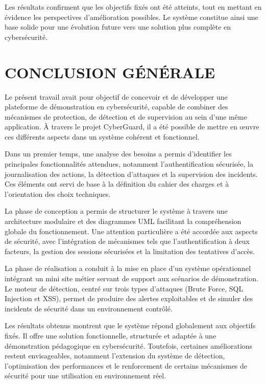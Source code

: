 \documentclass[a4paper,12pt]{report}
\begin{document}
    Les résultats confirment que les objectifs fixés ont été atteints, tout en mettant en évidence les perspectives d’amélioration possibles. Le système constitue ainsi une base solide pour une évolution future vers une solution plus complète en cybersécurité.
    
    \chapter{CONCLUSION GÉNÉRALE}
    
    Le présent travail avait pour objectif de concevoir et de développer une plateforme de démonstration en cybersécurité, capable de combiner des mécanismes de protection, de détection et de supervision au sein d’une même application. À travers le projet CyberGuard, il a été possible de mettre en œuvre ces différents aspects dans un système cohérent et fonctionnel.
    
    Dans un premier temps, une analyse des besoins a permis d’identifier les principales fonctionnalités attendues, notamment l’authentification sécurisée, la journalisation des actions, la détection d’attaques et la supervision des incidents. Ces éléments ont servi de base à la définition du cahier des charges et à l’orientation des choix techniques.
    
    La phase de conception a permis de structurer le système à travers une architecture modulaire et des diagrammes UML facilitant la compréhension globale du fonctionnement. Une attention particulière a été accordée aux aspects de sécurité, avec l’intégration de mécanismes tels que l’authentification à deux facteurs, la gestion des sessions sécurisées et la limitation des tentatives d’accès.
    
    La phase de réalisation a conduit à la mise en place d’un système opérationnel intégrant un mini site métier servant de support aux scénarios de démonstration. Le moteur de détection, centré sur trois types d’attaques (Brute Force, SQL Injection et XSS), permet de produire des alertes exploitables et de simuler des incidents de sécurité dans un environnement contrôlé.
    
    Les résultats obtenus montrent que le système répond globalement aux objectifs fixés. Il offre une solution fonctionnelle, structurée et adaptée à une démonstration pédagogique en cybersécurité. Toutefois, certaines améliorations restent envisageables, notamment l’extension du système de détection, l’optimisation des performances et le renforcement de certains mécanismes de sécurité pour une utilisation en environnement réel.
    
\end{document}
